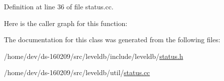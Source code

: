 Definition at line 36 of file status.\+cc.



Here is the caller graph for this function\+:




The documentation for this class was generated from the following files\+:\begin{DoxyCompactItemize}
\item 
/home/dev/ds-\/160209/src/leveldb/include/leveldb/\hyperlink{status_8h}{status.\+h}\item 
/home/dev/ds-\/160209/src/leveldb/util/\hyperlink{status_8cc}{status.\+cc}\end{DoxyCompactItemize}
